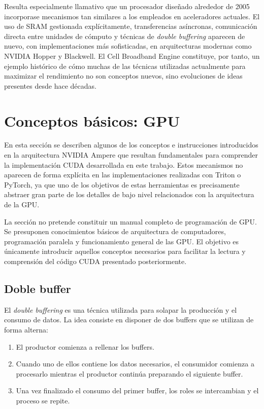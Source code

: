 Resulta especialmente llamativo que un procesador diseñado alrededor de 2005 incorporase mecanismos tan similares a los empleados en aceleradores actuales. El uso de SRAM gestionada explícitamente, transferencias asíncronas, comunicación directa entre unidades de cómputo y técnicas de \textit{double buffering} aparecen de nuevo, con implementaciones más sofisticadas, en arquitecturas modernas como NVIDIA Hopper y Blackwell. El Cell Broadband Engine constituye, por tanto, un ejemplo histórico de cómo muchas de las técnicas utilizadas actualmente para maximizar el rendimiento no son conceptos nuevos, sino evoluciones de ideas presentes desde hace décadas.

\section{Conceptos básicos: GPU}

En esta sección se describen algunos de los conceptos e instrucciones introducidos en la arquitectura NVIDIA Ampere que resultan fundamentales para comprender la implementación CUDA desarrollada en este trabajo. Estos mecanismos no aparecen de forma explícita en las implementaciones realizadas con Triton o PyTorch, ya que uno de los objetivos de estas herramientas es precisamente abstraer gran parte de los detalles de bajo nivel relacionados con la arquitectura de la GPU.

La sección no pretende constituir un manual completo de programación de GPU. Se presuponen conocimientos básicos de arquitectura de computadores, programación paralela y funcionamiento general de las GPU. El objetivo es únicamente introducir aquellos conceptos necesarios para facilitar la lectura y comprensión del código CUDA presentado posteriormente.

\subsection{Doble buffer}

El \textit{double buffering} es una técnica utilizada para solapar la producción y el consumo de datos. La idea consiste en disponer de dos buffers que se utilizan de forma alterna:

\begin{enumerate}
\item El productor comienza a rellenar los buffers.
\item Cuando uno de ellos contiene los datos necesarios, el consumidor comienza a procesarlo mientras el productor continúa preparando el siguiente buffer.
\item Una vez finalizado el consumo del primer buffer, los roles se intercambian y el proceso se repite.
\end{enumerate}

